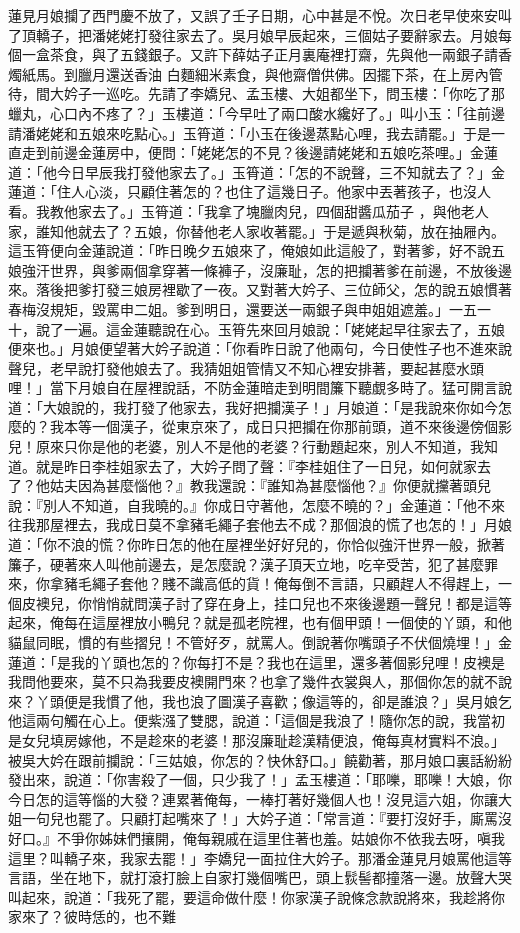蓮見月娘攔了西門慶不放了，又誤了壬子日期，心中甚是不悅。次日老早使來安叫了頂轎子，把潘姥姥打發往家去了。吳月娘早辰起來，三個姑子要辭家去。月娘每個一盒茶食，與了五錢銀子。又許下薛姑子正月裏庵裡打齋，先與他一兩銀子請香燭紙馬。到臘月還送香油 白麵細米素食，與他齋僧供佛。因擺下茶，在上房內管待，間大妗子一巡吃。先請了李嬌兒、孟玉樓、大姐都坐下，問玉樓：「你吃了那蠟丸，心口內不疼了？」玉樓道：「今早吐了兩口酸水纔好了。」叫小玉：「往前邊請潘姥姥和五娘來吃點心。」玉筲道：「小玉在後邊蒸點心哩，我去請罷。」于是一直走到前邊金蓮房中，便問：「姥姥怎的不見？後邊請姥姥和五娘吃茶哩。」金蓮道：「他今日早辰我打發他家去了。」玉筲道：「怎的不說聲，三不知就去了？」金蓮道：「住人心淡，只顧住著怎的？也住了這幾日子。他家中丟著孩子，也沒人看。我教他家去了。」玉筲道：「我拿了塊臘肉兒，四個甜醬瓜茄子 ，與他老人家，誰知他就去了？五娘，你替他老人家收著罷。」于是遞與秋菊，放在抽屜內。這玉筲便向金蓮說道：「昨日晚夕五娘來了，俺娘如此這般了，對著爹，好不說五娘強汗世界，與爹兩個拿穿著一條褲子，沒廉耻，怎的把攔著爹在前邊，不放後邊來。落後把爹打發三娘房裡歇了一夜。又對著大妗子、三位師父，怎的說五娘慣著春梅沒規矩，毀罵申二姐。爹到明日，還要送一兩銀子與申姐姐遮羞。」一五一十，說了一遍。這金蓮聽說在心。玉筲先來回月娘說：「姥姥起早往家去了，五娘便來也。」月娘便望著大妗子說道：「你看昨日說了他兩句，今日使性子也不進來說聲兒，老早說打發他娘去了。我猜姐姐管情又不知心裡安排著，要起甚麼水頭哩！」當下月娘自在屋裡說話，不防金蓮暗走到明間簾下聽覷多時了。猛可開言說道：「大娘說的，我打發了他家去，我好把攔漢子！」月娘道：「是我說來你如今怎麼的？我本等一個漢子，從東京來了，成日只把攔在你那前頭，道不來後邊傍個影兒！原來只你是他的老婆，別人不是他的老婆？行動題起來，別人不知道，我知道。就是昨日李桂姐家去了，大妗子問了聲：『李桂姐住了一日兒，如何就家去了？他姑夫因為甚麼惱他？』教我還說：『誰知為甚麼惱他？』你便就攩著頭兒說：『別人不知道，自我曉的。』你成日守著他，怎麼不曉的？」金蓮道：「他不來往我那屋裡去，我成日莫不拿豬毛繩子套他去不成？那個浪的慌了也怎的！」月娘道：「你不浪的慌？你昨日怎的他在屋裡坐好好兒的，你恰似強汗世界一般，掀著簾子，硬著來人叫他前邊去，是怎麼說？漢子頂天立地，吃辛受苦，犯了甚麼罪來，你拿豬毛繩子套他？賤不識高低的貨！俺每倒不言語，只顧趕人不得趕上，一個皮襖兒，你悄悄就問漢子討了穿在身上，挂口兒也不來後邊題一聲兒！都是這等起來，俺每在這屋裡放小鴨兒？就是孤老院裡，也有個甲頭！一個使的丫頭，和他貓鼠同眠，慣的有些摺兒！不管好歹，就罵人。倒說著你嘴頭子不伏個燒埋！」金蓮道：「是我的丫頭也怎的？你每打不是？我也在這里，還多著個影兒哩！皮襖是我問他要來，莫不只為我要皮襖開門來？也拿了幾件衣裳與人，那個你怎的就不說來？丫頭便是我慣了他，我也浪了圖漢子喜歡；像這等的，卻是誰浪？」吳月娘乞他這兩句觸在心上。便紫漒了雙腮，說道：「這個是我浪了！隨你怎的說，我當初是女兒填房嫁他，不是趁來的老婆！那沒廉耻趁漢精便浪，俺每真材實料不浪。」被吳大妗在跟前攔說：「三姑娘，你怎的？快休舒口。」饒勸著，那月娘口裏話紛紛發出來，說道：「你害殺了一個，只少我了！」孟玉樓道：「耶嚛，耶嚛！大娘，你今日怎的這等惱的大發？連累著俺每，一棒打著好幾個人也！沒見這六姐，你讓大姐一句兒也罷了。只顧打起嘴來了！」大妗子道：「常言道：『要打沒好手，廝罵沒好口。』不爭你姊妹們攘開，俺每親戚在這里住著也羞。姑娘你不依我去呀，嗔我這里？叫轎子來，我家去罷！」李嬌兒一面拉住大妗子。那潘金蓮見月娘罵他這等言語，坐在地下，就打滾打臉上自家打幾個嘴巴，頭上䯼髻都撞落一邊。放聲大哭叫起來，說道：「我死了罷，要這命做什麼！你家漢子說條念款說將來，我趁將你家來了？彼時恁的，也不難